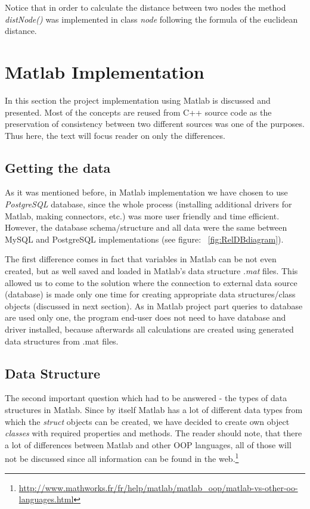 \documentclass{article}
\begin{document}
Notice that in order to calculate the distance between two nodes the method \textit{distNode()} was implemented in class \textit{node } following the formula of the euclidean distance. 

\clearpage
\section{Matlab Implementation}
       
In this section the project implementation using Matlab is discussed and presented. Most of the concepts are reused from C++ source code as the preservation of consistency between two different sources was one of the purposes. Thus here, the text will focus reader on only the differences.

\subsection{Getting the data}

As it was mentioned before, in Matlab implementation we have chosen to use \textit{PostgreSQL} database, since the whole process (installing additional drivers for Matlab, making connectors, etc.) was more user friendly and time efficient. However, the database schema/structure and all data were the same between MySQL and PostgreSQL implementations (see figure: ~\ref{fig:RelDBdiagram}).

The first difference comes in fact that variables in Matlab can be not even created, but as well saved and loaded in Matlab's data structure \textit{.mat} files. This allowed us to come to the solution where the connection to external data source (database) is made only one time for creating appropriate data structures/class objects (discussed in next section). As in Matlab project part queries to database are used only one, the program end-user does not need to have database and driver installed, because afterwards all calculations are created using generated data structures from .mat files.

\subsection{Data Structure}

The second important question which had to be answered - the types of data structures in Matlab.
Since by itself Matlab has a lot of different data types from which the \textit{struct} objects can be created, we have decided to create own object \textit{classes} with required properties and methods. The reader should note, that there a lot of differences between Matlab and other OOP languages, all of those will not be discussed since all information can be found in the web.\footnote{
\url{http://www.mathworks.fr/fr/help/matlab/matlab_oop/matlab-vs-other-oo-languages.html}
}
\end{document}
